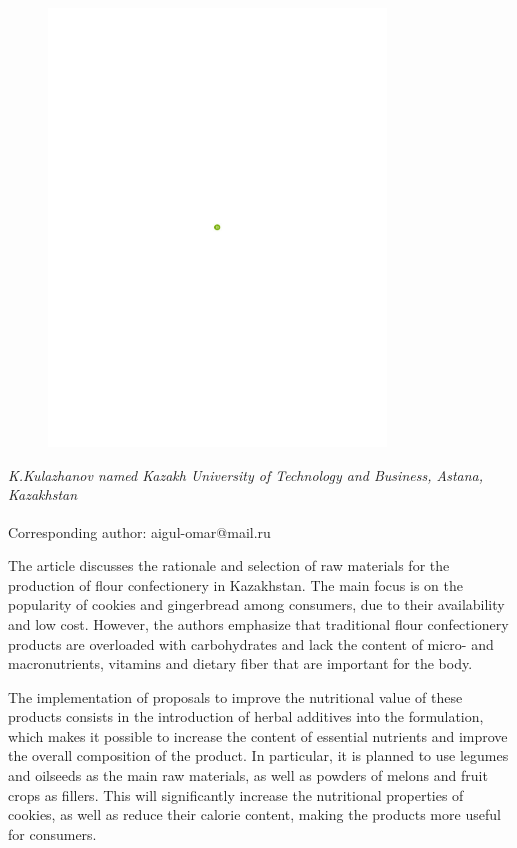 \begin{figure}[H]
	\centering
	\includegraphics[width=0.8\textwidth]{media/pish2/image2}
	\caption*{}
\end{figure}


\emph{K.Kulazhanov named Kazakh University of Technology and Business,
Astana, Kazakhstan}

{\bfseries \textsuperscript{\envelope }}Corresponding author: aigul-omar@mail.ru

The article discusses the rationale and selection of raw materials for
the production of flour confectionery in Kazakhstan. The main focus is
on the popularity of cookies and gingerbread among consumers, due to
their availability and low cost. However, the authors emphasize that
traditional flour confectionery products are overloaded with
carbohydrates and lack the content of micro- and macronutrients,
vitamins and dietary fiber that are important for the body.

The implementation of proposals to improve the nutritional value of
these products consists in the introduction of herbal additives into the
formulation, which makes it possible to increase the content of
essential nutrients and improve the overall composition of the product.
In particular, it is planned to use legumes and oilseeds as the main raw
materials, as well as powders of melons and fruit crops as fillers. This
will significantly increase the nutritional properties of cookies, as
well as reduce their calorie content, making the products more useful
for consumers.

